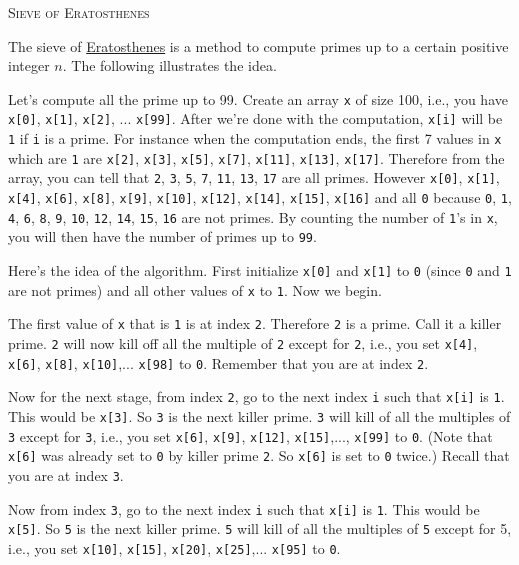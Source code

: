 \textsc{Sieve of Eratosthenes}

The sieve of \href{https://en.wikipedia.org/wiki/Eratosthenes}{Eratosthenes} is a method to compute
primes up to a certain positive integer $n$.
The following illustrates the idea.

Let's compute all the prime up to 99.
Create an array \verb!x! of size 100, i.e.,
you have
\verb!x[0]!,
\verb!x[1]!,
\verb!x[2]!, ...
\verb!x[99]!.
After we're done with the computation, 
\verb!x[i]! will be \verb!1! if \verb!i! is a prime.
For instance when the computation ends,
the first 7 values in \verb!x! which are \verb!1! are
\verb!x[2]!,
\verb!x[3]!,
\verb!x[5]!,
\verb!x[7]!,
\verb!x[11]!,
\verb!x[13]!,
\verb!x[17]!.
Therefore from the array, you can tell that
\verb!2!,
\verb!3!,
\verb!5!,
\verb!7!,
\verb!11!,
\verb!13!,
\verb!17!
are all primes.
However
\verb!x[0]!,
\verb!x[1]!,
\verb!x[4]!,
\verb!x[6]!,
\verb!x[8]!,
\verb!x[9]!,
\verb!x[10]!,
\verb!x[12]!,
\verb!x[14]!,
\verb!x[15]!,
\verb!x[16]!
and all \verb!0! because
\verb!0!,
\verb!1!,
\verb!4!,
\verb!6!,
\verb!8!,
\verb!9!,
\verb!10!,
\verb!12!,
\verb!14!,
\verb!15!,
\verb!16!
are not primes.
By counting the number of \verb!1!'s in \verb!x!, you will then have
the number of primes up to \verb!99!.

Here's the idea of the algorithm.
First initialize 
\verb!x[0]! and 
\verb!x[1]! to \verb!0! (since \verb!0! and \verb!1! are not
primes)
and all other values of \verb!x! to \verb!1!.
Now we begin.

The first value of \verb!x! that is \verb!1! is at index \verb!2!.
Therefore \verb!2! is a prime.
Call it a killer prime.
\verb!2! will now kill off all the multiple of \verb!2! except for \verb!2!,
i.e.,
you set
\verb!x[4]!,
\verb!x[6]!,
\verb!x[8]!,
\verb!x[10]!,...
\verb!x[98]! to \verb!0!.
Remember that you are at index \verb!2!.

Now for the next stage, from index \verb!2!, go to the next
index \verb!i! such that \verb!x[i]! is \verb!1!.
This would be \verb!x[3]!.
So \verb!3! is the next killer prime.
\verb!3! will kill of all the multiples of \verb!3! except for \verb!3!, i.e., 
you set
\verb!x[6]!,
\verb!x[9]!,
\verb!x[12]!,
\verb!x[15]!,...,
\verb!x[99]! to \verb!0!.
(Note that \verb!x[6]! was already set to \verb!0! by
killer prime \verb!2!.
So \verb!x[6]! is set to \verb!0! twice.)
Recall that you are at index \verb!3!.

Now from index \verb!3!, go to the next
index \verb!i! such that \verb!x[i]! is \verb!1!.
This would be \verb!x[5]!.
So \verb!5! is the next killer prime.
\verb!5! will kill of all the multiples of \verb!5! except for 5, i.e., 
you set
\verb!x[10]!,
\verb!x[15]!,
\verb!x[20]!,
\verb!x[25]!,...
\verb!x[95]! to \verb!0!.

